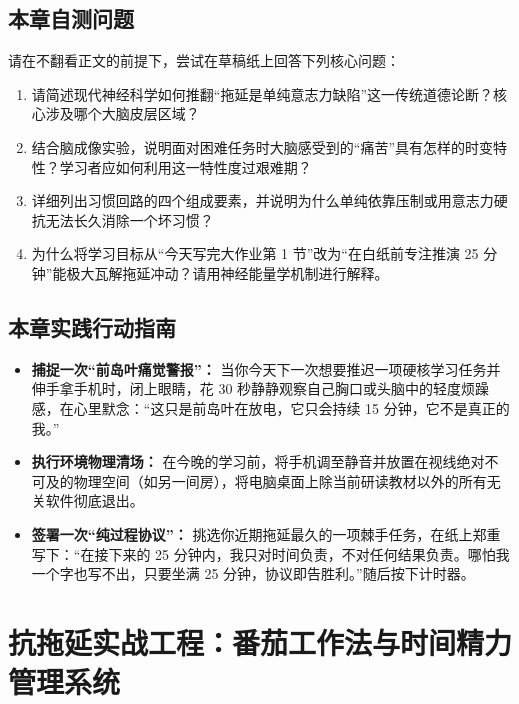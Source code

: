 \documentclass[12pt,a4paper,openany]{ctexbook}
\begin{document}
\section*{本章自测问题}
请在不翻看正文的前提下，尝试在草稿纸上回答下列核心问题：
\begin{enumerate}
    \item 请简述现代神经科学如何推翻“拖延是单纯意志力缺陷”这一传统道德论断？核心涉及哪个大脑皮层区域？
    \item 结合脑成像实验，说明面对困难任务时大脑感受到的“痛苦”具有怎样的时变特性？学习者应如何利用这一特性度过艰难期？
    \item 详细列出习惯回路的四个组成要素，并说明为什么单纯依靠压制或用意志力硬抗无法长久消除一个坏习惯？
    \item 为什么将学习目标从“今天写完大作业第 1 节”改为“在白纸前专注推演 25 分钟”能极大瓦解拖延冲动？请用神经能量学机制进行解释。
\end{enumerate}

\section*{本章实践行动指南}
\begin{practicebox}[本周拖延回路外科重塑清单]
\begin{itemize}
    \item[$\square$] \textbf{捕捉一次“前岛叶痛觉警报”：} 当你今天下一次想要推迟一项硬核学习任务并伸手拿手机时，闭上眼睛，花 30 秒静静观察自己胸口或头脑中的轻度烦躁感，在心里默念：“这只是前岛叶在放电，它只会持续 15 分钟，它不是真正的我。”
    \item[$\square$] \textbf{执行环境物理清场：} 在今晚的学习前，将手机调至静音并放置在视线绝对不可及的物理空间（如另一间房），将电脑桌面上除当前研读教材以外的所有无关软件彻底退出。
    \item[$\square$] \textbf{签署一次“纯过程协议”：} 挑选你近期拖延最久的一项棘手任务，在纸上郑重写下：“在接下来的 25 分钟内，我只对时间负责，不对任何结果负责。哪怕我一个字也写不出，只要坐满 25 分钟，协议即告胜利。”随后按下计时器。
\end{itemize}
\end{practicebox}


\chapter{抗拖延实战工程：番茄工作法与时间精力管理系统}
\end{document}
